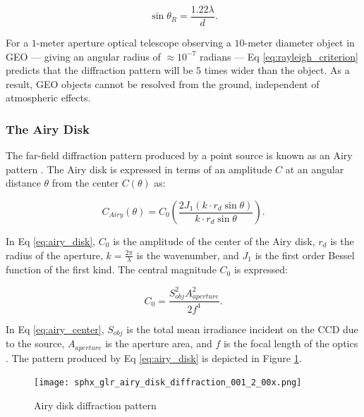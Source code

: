 \begin{equation} \label{eq:rayleigh_criterion}
  \sin\theta_R = \frac{1.22 \lambda}{d}.
\end{equation}

For a $1$-meter aperture optical telescope observing a $10$-meter diameter object in GEO --- giving an angular radius of $\approx 10^{-7}$ radians --- Eq \ref{eq:rayleigh_criterion} predicts that the diffraction pattern will be $5$ times wider than the object. As a result, GEO objects cannot be resolved from the ground, independent of atmospheric effects. 

\subsubsection{The Airy Disk}

The far-field diffraction pattern produced by a point source is known as an Airy pattern \cite{frueh2019notes}. The Airy disk is expressed in terms of an amplitude $C$ at an angular distance $\theta$ from the center $C(\theta)$ as:

\begin{equation} \label{eq:airy_disk}
  C_{Airy}(\theta) = C_0 \left( \frac{2 J_1(k \cdot r_d \sin\theta)}{k \cdot r_d \sin\theta} \right).
\end{equation}

In Eq \ref{eq:airy_disk}, $C_0$ is the amplitude of the center of the Airy disk, $r_d$ is the radius of the aperture, $k = \frac{2\pi}{\lambda}$ is the wavenumber, and $J_1$ is the first order Bessel function of the first kind. The central magnitude $C_0$ is expressed:

\begin{equation} \label{eq:airy_center}
  C_0 = \frac{S_{obj}^2 A_{aperture}^2}{2 f^4}.
\end{equation}

In Eq \ref{eq:airy_center}, $S_{obj}$ is the total mean irradiance incident on the CCD due to the source, $A_{aperture}$ is the aperture area, and $f$ is the focal length of the optics \cite{frueh2019notes}. The pattern produced by Eq \ref{eq:airy_disk} is depicted in Figure \ref{fig:airy_disk_magnitude}.

\begin{figure}[ht]
  \centering
  \texttt{[image: sphx\_glr\_airy\_disk\_diffraction\_001\_2\_00x.png]}
  \caption{Airy disk diffraction pattern}
  \label{fig:airy_disk_magnitude}
\end{figure}

